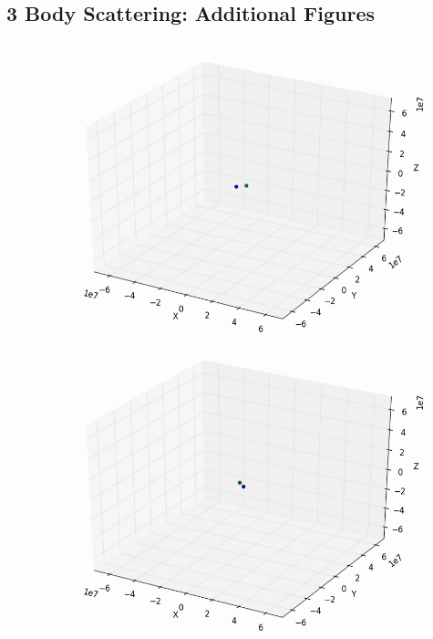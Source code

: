 \documentclass[10pt,letterpaper]{article}
\begin{document}
\pagebreak
\subsection{3 Body Scattering: Additional Figures}

\begin{figure}[!htb]
  \includegraphics[width=\linewidth]{figures/three_body/1_1.png}
  \subcaption{}\label{fig:1_1}
\endminipage\hfill
{}
  \includegraphics[width=\linewidth]{figures/three_body/1_2.png}
  \subcaption{}\label{fig:1_2}
\endminipage\hfill
{}

\end{figure}
\end{document}
